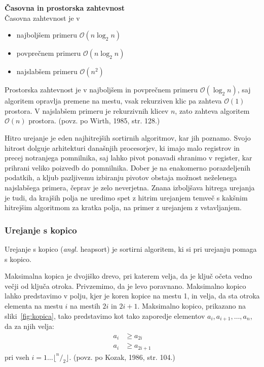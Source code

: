 \documentclass[a4paper,oneside,12pt]{article}
\newcommand{\subsubsubsection}[1]{\vspace*{1ex}\textbf{#1}\\}
\begin{document}
\subsubsubsection{Časovna in prostorska zahtevnost}
Časovna zahtevnost je v
\begin{itemize}
  \item najboljšem primeru $\mathcal{O}(n\log_2 n)$
  \item povprečnem primeru $\mathcal{O}(n\log_2 n)$
  \item najslabšem primeru $\mathcal{O}(n^2)$
\end{itemize}

Prostorska zahtevnost je v najboljšem in povprečnem primeru $\mathcal{O}(\log_2 n)$, 
saj algoritem opravlja premene na mestu, vsak rekurziven klic pa zahteva $\mathcal{O}(1)$ prostora.
V najslabšem primeru je rekurzivnih klicev $n$, zato zahteva algoritem
$\mathcal{O}(n)$ prostora.
(povz. po Wirth, 1985, str. 128.)

Hitro urejanje je eden najhitrejših sortirnih algoritmov, kar jih
poznamo. Svojo hitrost dolguje arhitekturi današnjih procesorjev, ki imajo
malo registrov in precej notranjega pomnilnika, saj lahko pivot ponavadi shranimo v
register, kar prihrani veliko poizvedb do pomnilnika. Dober je na enakomerno
porazdeljenih podatkih, a kljub pazljivemu izbiranju pivotov obstaja možnost neželenega
najslabšega primera, čeprav je zelo neverjetna. Znana izboljšava hitrega
urejanja je tudi, da krajših polja ne uredimo spet z hitrim urejanjem temveč s
kakšnim hitrejšim algoritmom za kratka polja, na primer z urejanjem z
vstavljanjem.

\subsubsection{Urejanje s kopico}
\label{chapter:heapsort}
Urejanje s kopico (\emph{angl.} heapsort) je sortirni algoritem,
ki si pri urejanju pomaga s kopico.

Maksimalna kopica je dvojiško drevo, pri katerem velja, da je ključ očeta
vedno večji od ključa otroka. Privzemimo, da je levo poravnano.
Maksimalno kopico lahko predstavimo v polju, kjer je koren kopice na mestu 
1, in velja, da sta otroka elementa na mestu $i$ na mestih $2i$ in $2i + 1$.
Maksimalno kopico, prikazano na sliki~\ref{fig:kopica}, tako predstavimo kot tako zaporedje elementov $a_i, a_{i+1}, \ldots,
a_n$, da za njih velja:
\begin{align*}
  a_i &\geq a_{2i} \\
  a_i &\geq a_{2i+1}
\end{align*}
pri vseh $i = 1 \ldots \lfloor ^n/_2 \rfloor$.
(povz. po Kozak, 1986, str. 104.)
\end{document}
